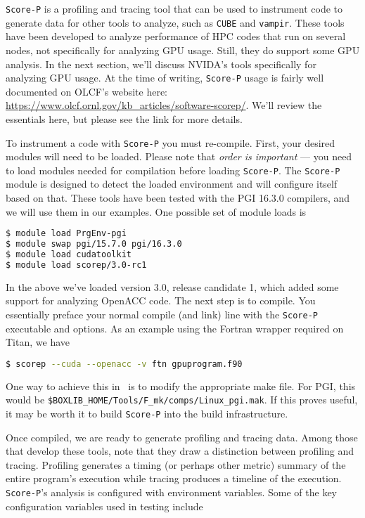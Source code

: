 {\tt Score-P} is a profiling and tracing tool that can be used to instrument
code to generate data for other tools to analyze, such as {\tt CUBE} and 
{\tt vampir}.  These tools have been developed to analyze performance of HPC
codes that run on several nodes, not specifically for analyzing GPU usage.
Still, they do support some GPU analysis.  In the next section, we'll discuss
NVIDA's tools specifically for analyzing GPU usage.
At the time of writing, {\tt Score-P} usage is fairly well documented on OLCF's
website here: \url{https://www.olcf.ornl.gov/kb_articles/software-scorep/}.
We'll review the essentials here, but please see the link for more details.

To instrument a code with {\tt Score-P} you must re-compile.  First, your
desired modules will need to be loaded.  Please note that \emph{order is
important} --- you need to load modules needed for compilation before loading 
{\tt Score-P}.  The {\tt Score-P} module is designed to detect the loaded
environment and will configure itself based on that.  These tools have been
tested with the PGI 16.3.0 compilers, and we will use them in our examples.
One possible set of module loads is

\begin{lstlisting}[language=bash,mathescape=false]
$ module load PrgEnv-pgi
$ module swap pgi/15.7.0 pgi/16.3.0
$ module load cudatoolkit
$ module load scorep/3.0-rc1
\end{lstlisting}

In the above we've loaded version 3.0, release candidate 1, which added some
support for analyzing OpenACC code.  The next step is to compile.  You
essentially preface your normal compile (and link) line with the {\tt Score-P}
executable and options.  As an example using the Fortran wrapper required on
Titan, we have

\begin{lstlisting}[language=bash,mathescape=false]
$ scorep --cuda --openacc -v ftn gpuprogram.f90
\end{lstlisting}

One way to achieve this in \maestro\ is to modify the appropriate make file.  For
PGI, this would be {\tt \$BOXLIB\_HOME/Tools/F\_mk/comps/Linux\_pgi.mak}.  If
this proves useful, it may be worth it to build {\tt Score-P} into the build
infrastructure.

Once compiled, we are ready to generate profiling and tracing data.  Among those
that develop these tools, note that they draw a distinction between profiling
and tracing.  Profiling generates a timing (or perhaps other metric) summary of
the entire program's execution while tracing produces a timeline of the
execution. {\tt Score-P}'s analysis is configured with environment variables.
Some of the key configuration variables used in testing include

